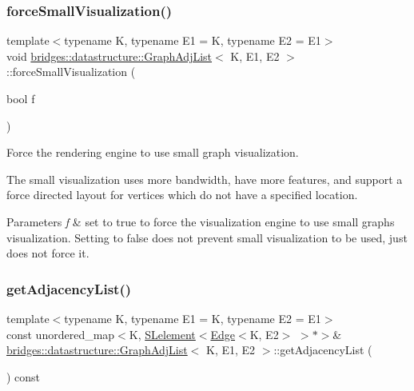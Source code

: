 \subsubsection{\texorpdfstring{force\+Small\+Visualization()}{forceSmallVisualization()}}
{\footnotesize\ttfamily template$<$typename K, typename E1 = K, typename E2 = E1$>$ \\
void \hyperlink{classbridges_1_1datastructure_1_1_graph_adj_list}{bridges\+::datastructure\+::\+Graph\+Adj\+List}$<$ K, E1, E2 $>$\+::force\+Small\+Visualization (\begin{DoxyParamCaption}\item[{bool}]{f }\end{DoxyParamCaption})\hspace{0.3cm}{\ttfamily [inline]}}



Force the rendering engine to use small graph visualization. 

The small visualization uses more bandwidth, have more features, and support a force directed layout for vertices which do not have a specified location.


\begin{DoxyParams}{Parameters}
{\em f} & set to true to force the visualization engine to use small graphs visualization. Setting to false does not prevent small visualization to be used, just does not force it. \\
\hline
\end{DoxyParams}
\mbox{\label{classbridges_1_1datastructure_1_1_graph_adj_list_a23dad50371f073dd9a2f48e83720e86c}} 
\subsubsection{\texorpdfstring{get\+Adjacency\+List()}{getAdjacencyList()}\hspace{0.1cm}{\footnotesize\ttfamily [1/3]}}
{\footnotesize\ttfamily template$<$typename K, typename E1 = K, typename E2 = E1$>$ \\
const unordered\+\_\+map$<$K, \hyperlink{classbridges_1_1datastructure_1_1_s_lelement}{S\+Lelement}$<$\hyperlink{classbridges_1_1datastructure_1_1_edge}{Edge}$<$K, E2$>$ $>$$\ast$$>$\& \hyperlink{classbridges_1_1datastructure_1_1_graph_adj_list}{bridges\+::datastructure\+::\+Graph\+Adj\+List}$<$ K, E1, E2 $>$\+::get\+Adjacency\+List (\begin{DoxyParamCaption}{ }\end{DoxyParamCaption}) const\hspace{0.3cm}{\ttfamily [inline]}}



